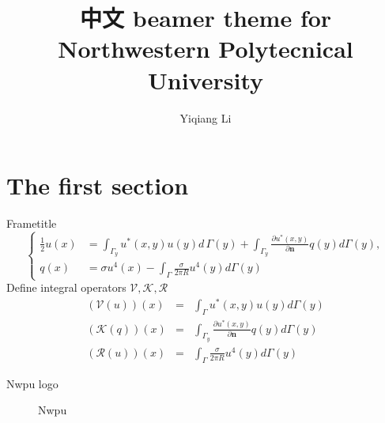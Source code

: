 \documentclass[xetex,8pt]{beamer}
\title[NPU theme]{\large \textbf{中文} beamer theme for Northwestern Polytecnical University }
\author[Y. Li]{Yiqiang Li}
\institute[Dept. Applied Math.]{Department of Applied Mathmethics}
\begin{document}

\section{The first section}
\begin{frame}[t]{Frametitle}
	\begin{equation}
		\left\{
		\begin{aligned}
			\frac{1}{2}u(x) &= \int_{\Gamma_y}u^*(x,y)u(y) d\,\Gamma (y) + \int_{\Gamma_y} \frac{\partial u^*(x,y)}{\partial \mathbf{n}} q(y) d \Gamma(y), \\
			q(x) &= \sigma u^4(x) - \int_\Gamma \frac{\sigma}{2 \pi R} u^4(y) d\Gamma(y)
		\end{aligned}
		\right.
	\end{equation}
	Define integral operators $\mathcal{V},\mathcal{K},\mathcal{R}$
		\begin{eqnarray*}
			(\mathcal{V}(u))(x) &=& \int_\Gamma u^*(x,y)u(y) d\Gamma(y) \\
			(\mathcal{K}(q))(x) &=& \int_{\Gamma_y} \frac{\partial u^*(x,y)}{\partial \mathbf{n}} q(y) d \Gamma(y) \\
			(\mathcal{R}(u))(x) &=& \int_\Gamma \frac{\sigma}{2 \pi R} u^4(y) d\Gamma(y)
		\end{eqnarray*}
\end{frame}
\begin{frame}[t]{Nwpu logo}
	\begin{figure}[htbp]
		\begin{center}
		\end{center}
		\caption{Nwpu}
		\label{fig:nwpu}
	\end{figure}
	
\end{frame}
\end{document}
